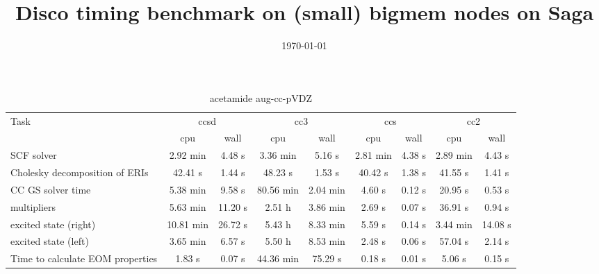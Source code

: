 \documentclass{article}
\title{Disco timing benchmark on (small) bigmem nodes on Saga}
\date{\today}
\begin{document}
\maketitle
\begin{table}
\caption{acetamide aug-cc-pVDZ}
\begin{tabular}{lcccccccc}
\toprule
Task & \multicolumn{2}{c}{ccsd} & \multicolumn{2}{c}{cc3} & \multicolumn{2}{c}{ccs} & \multicolumn{2}{c}{cc2}\\
\cmidrule(lr){2-3}\cmidrule(lr){4-5}\cmidrule(lr){6-7}\cmidrule(lr){8-9}
 & cpu & wall & cpu & wall & cpu & wall & cpu & wall\\
\midrule
SCF solver & 2.92 min & 4.48 s & 3.36 min & 5.16 s & 2.81 min & 4.38 s & 2.89 min & 4.43 s\\
Cholesky decomposition of ERIs & 42.41 s & 1.44 s & 48.23 s & 1.53 s & 40.42 s & 1.38 s & 41.55 s & 1.41 s\\
CC GS solver time & 5.38 min & 9.58 s & 80.56 min & 2.04 min & 4.60 s & 0.12 s & 20.95 s & 0.53 s\\
multipliers & 5.63 min & 11.20 s & 2.51 h & 3.86 min & 2.69 s & 0.07 s & 36.91 s & 0.94 s\\
excited state (right) & 10.81 min & 26.72 s & 5.43 h & 8.33 min & 5.59 s & 0.14 s & 3.44 min & 14.08 s\\
excited state (left) & 3.65 min & 6.57 s & 5.50 h & 8.53 min & 2.48 s & 0.06 s & 57.04 s & 2.14 s\\
Time to calculate EOM properties & 1.83 s & 0.07 s & 44.36 min & 75.29 s & 0.18 s & 0.01 s & 5.06 s & 0.15 s\\
\bottomrule
\end{tabular}
\end{table}
\end{document}
